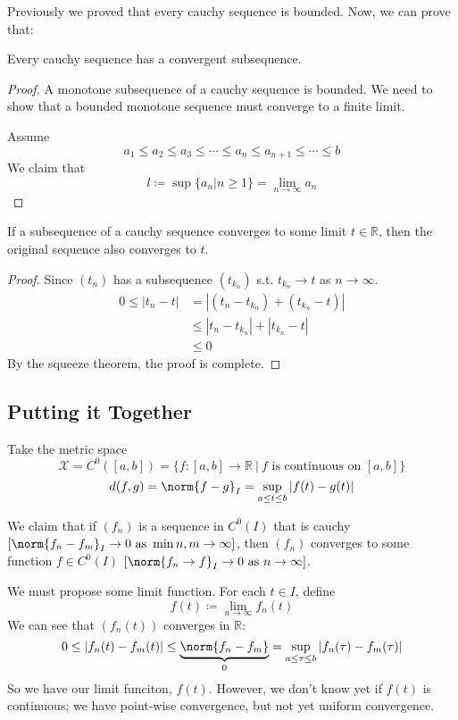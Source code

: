 \documentclass[12pt]{article}
\begin{document}
Previously we proved that every cauchy sequence is bounded. Now, we can prove that:
\begin{lemma}
Every cauchy sequence has a convergent subsequence.
\end{lemma}
\begin{proof}
A monotone subsequence of a cauchy sequence is bounded. We need to show that a bounded monotone sequence must converge to a finite limit.

Assume \[ a_1 \le a_2 \le a_3 \le \cdots \le a_n \le a_{n+1} \le \cdots \le b \]
We claim that \[ l \coloneqq \sup\{a_n | n \ge 1\} = \lim_{n \to \infty} a_n \]
\end{proof}

\begin{lemma}
If a subsequence of a cauchy sequence converges to some limit $t \in \mathbb{R}$, then the original sequence also converges to $t$.
\end{lemma}
\begin{proof}
Since $(t_n)$ has a subsequence $(t_{k_n})$ s.t. $t_{k_n} \to t$ as $n \to \infty$.
\[
\begin{aligned}
0 \le |t_n - t| &= |(t_n - t_{k_n}) + (t_{k_n} -t)| \\
&\le |t_n - t_{k_n}| + |t_{k_n} - t| \\
&\le 0
\end{aligned}
\]
By the squeeze theorem, the proof is complete.
\end{proof}

\subsection{Putting it Together}
Take the metric space \[ \mathscr{X} = C^0([a,b]) = \{f:[a,b] \to \mathbb{R}  \ | \ f \text{ is continuous on } [a,b]\} \]
\[ d(f,g) = \norm{f-g}_I = \sup_{a \le t \le b} |f(t) - g(t)| \]

We claim that if $(f_n)$ is a sequence in $C^0(I)$ that is cauchy $[ \norm{f_n - f_m}_I \to 0 \text{ as } \min{n,m} \to \infty ]$, then $(f_n)$ converges to some function $f \in C^0(I)$ $[\norm{f_n \to f}_I \to 0 \text{ as } n \to \infty]$.

We must propose some limit function. For each $t \in I$, define \[ f(t) \coloneqq \lim_{n \to \infty}f_n(t) \]
We can see that $(f_n(t))$  converges in $\mathbb{R}$:
\[ 0 \le |f_n(t) - f_m(t)| \le \underbrace{\norm{f_n - f_m}}_{0} = \sup_{a\le \tau \le b}|f_n(\tau) - f_m(\tau)| \]
So we have our limit funciton, $f(t)$. However, we don't know yet if $f(t)$ is continuous; we have point-wise convergence, but not yet uniform convergence.
\end{document}
